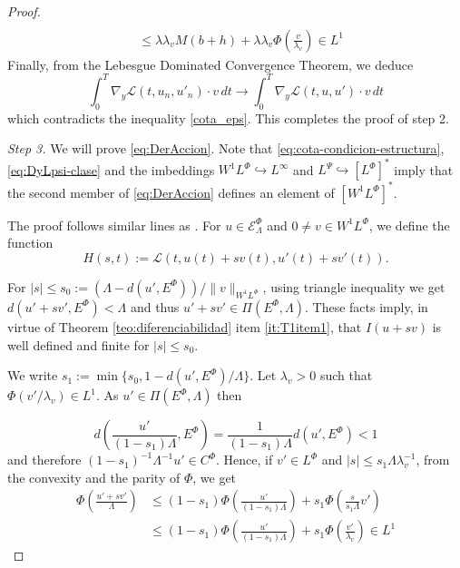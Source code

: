 \documentclass[twoside]{article}
\theoremstyle{remark}
\newcommand{\lphi}{L^{\Phi}}
\newcommand{\lpsi}{L^{\Psi}}
\newcommand{\ephi}{E^{\Phi}}
\newcommand{\wphi}{W^{1}\lphi}
\newcommand{\sobnor}{\|_{W^{1}\lphi}}
\newcommand{\domi}{\mathcal{E}^{\Phi}}
\renewcommand{\leq}{\leqslant}
\begin{document}
\begin{proof}
\begin{equation}
\begin{split}
\\
&\leq \lambda\lambda_v M (b+h)+\lambda\lambda_v  \Phi\left(\frac{v}{\lambda_v}\right)\in L^1
\end{split}
\end{equation}
  Finally, from the Lebesgue Dominated Convergence Theorem, we deduce
\begin{equation}\label{conv_debil}
\int_0^T  \nabla_y\mathcal{L}(t,u_{n},u'_{n})
\cdot  v \,dt
\to 
\int_0^T \nabla_y\mathcal{L}(t,u,u')\cdot v\, dt \end{equation}
which contradicts the inequality \eqref{cota_eps}. This completes the proof of step 2.

\emph{Step 3.} We will prove \eqref{eq:DerAccion}. 
 Note that \eqref{eq:cota-condicion-estructura},  \eqref{eq:DyLpsi-clase} and the imbeddings $\wphi \hookrightarrow L^{\infty}$ and  
$\lpsi\hookrightarrow  \left[\lphi\right]^*$ imply that the second member of
\eqref{eq:DerAccion} defines an element of $\left[\wphi\right]^*$.

The proof follows similar lines as \cite[Thm. 1.4]{mawhin2010critical}. 
For $u\in \domi_{\Lambda}$ and $0\neq v\in\wphi$, we define the function
\[H(s,t):=\mathcal{L}(t,u(t)+s v(t),u'(t)+sv'(t)).\]



For  $|s|\leq s_0:=\left(\Lambda-d(u',\ephi)\right)/\|v\sobnor$, 
using triangle inequality we get 
$
d \left(u'+s v', \ephi \right)<\Lambda$ and thus $u'+sv' \in \Pi(\ephi,\Lambda)$. 
These facts imply, in virtue of Theorem \ref{teo:diferenciabilidad} item \ref{it:T1item1}, 
that $I(u+s v)$ is well defined and finite for $|s|\leq s_0$. 



We write $s_1:=\min\{s_0,1-d(u',\ephi)/\Lambda\}$. Let $\lambda_v>0$ such that $\Phi(v'/\lambda_v)\in L^1$. As $u'\in\Pi(\ephi,\Lambda)$ then

\[
d\left(\frac{u'}{(1-s_1)\Lambda},E^{\Phi}\right)=\frac{1}{(1-s_1)\Lambda}d(u', E^{\Phi})<1
\]
and therefore $(1-s_1)^{-1}\Lambda^{-1}u'\in C^\Phi$. Hence,  if $v'\in\lphi$ and $|s|\leq s_1 \Lambda\lambda_v^{-1}$, from the convexity and the parity of $\Phi$, we get
\begin{equation}\label{eq:cota-u+sv}
\begin{split}
\Phi\left(\frac{u'+sv'}{\Lambda}\right)&
\leq
(1-s_1)\Phi\left(\frac{u'}{(1-s_1)\Lambda}\right)+s_1 \Phi\left(\frac{s}{s_1\Lambda}v'\right)
\\
&\leq
(1-s_1)\Phi\left(\frac{u'}{(1-s_1)\Lambda}\right)+s_1 \Phi\left(\frac{v'}{\lambda_v}\right)
\in L^1
\end{split}
\end{equation}




\end{proof}
\end{document}
